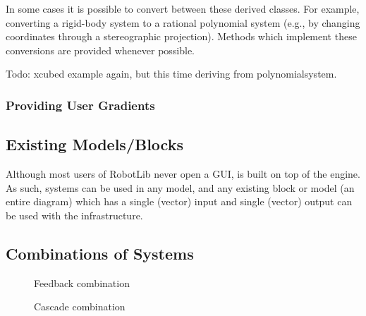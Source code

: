 In some cases it is possible to convert between these derived
classes.  For example, converting a rigid-body system to a rational
polynomial system (e.g., by changing coordinates through a
stereographic projection).  Methods which implement these conversions are
provided whenever possible.  

Todo: xcubed example again, but this time deriving from polynomialsystem.  


\subsubsection{Providing User Gradients}


\subsection{Existing \simulink Models/Blocks}\label{s:simulinksystem}

Although most users of RobotLib never open a \simulink GUI, \robotlib
is built on top of the \matlab \simulink engine.  As such, \robotlib
systems can be used in any \simulink model, and any existing \simulink
block or \simulink model (an entire \simulink diagram) which has a
single (vector) input and single (vector) output can be used with the
\robotlib infrastructure.  

\subsection{Combinations of Systems}

\begin{figure}[h]
\begin{center}
\end{center}
\caption{Feedback combination}
\end{figure}

\begin{figure}[h]
\begin{center}
\end{center}
\caption{Cascade combination}
\end{figure}

